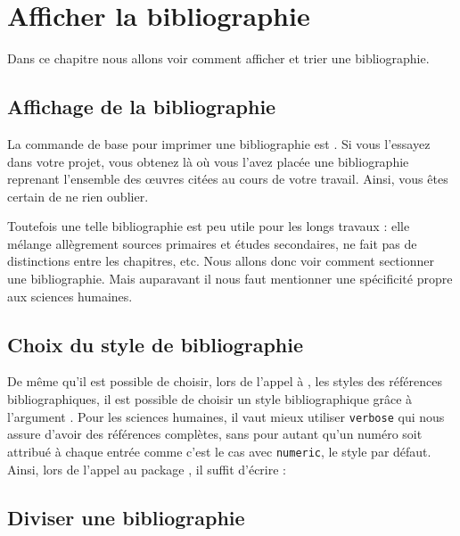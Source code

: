 \chapter{Afficher la bibliographie}

\begin{prealable}

Dans ce chapitre nous allons voir comment afficher et trier une bibliographie.
\end{prealable}


\section{Affichage de la bibliographie}

La commande de base  pour imprimer une bibliographie est . Si vous l'essayez dans votre projet, vous obtenez là où vous l'avez placée une bibliographie reprenant l'ensemble des œuvres  citées au cours de votre travail. Ainsi, vous êtes certain de ne rien oublier.

Toutefois une telle bibliographie est peu utile pour les longs travaux : elle mélange allègrement sources primaires et études secondaires, ne fait pas de distinctions entre les chapitres, etc. Nous allons donc voir  comment sectionner une bibliographie. Mais auparavant il nous faut mentionner une spécificité propre aux sciences humaines.



\section{Choix du style de bibliographie}

De même qu'il est possible de choisir, lors de l'appel à , les styles des références bibliographiques, il est possible de choisir un style bibliographique grâce à l'argument . Pour les sciences humaines, il vaut mieux utiliser \verb|verbose| qui nous assure d'avoir des références complètes, sans pour autant qu'un numéro soit attribué à chaque entrée comme c'est le cas avec \verb|numeric|, le style par défaut.
Ainsi, lors de l'appel au package , il suffit d'écrire :

\begin{latexcode}
\usepackage[bibstyle=verbose,...]{biblatex}
\end{latexcode}

\section{Diviser une bibliographie}

